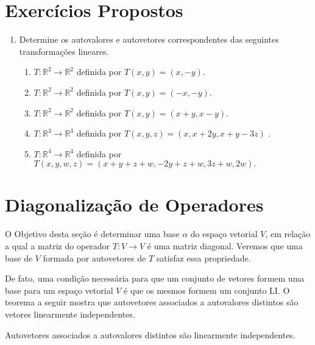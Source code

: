 \section{Exercícios Propostos}
\begin{enumerate}
\item  Determine os autovalores e autovetores correspondentes das seguintes transformações lineares.
\begin{enumerate}[label=(\alph*)]
\item $T: \mathbb{R}^2 \rightarrow \mathbb{R}^2$  definida por $T(x,y)=(x,-y)$.
\item  $T: \mathbb{R}^2 \rightarrow \mathbb{R}^2$  definida por $T(x,y)=(-x,-y)$.
\item  $T: \mathbb{R}^2 \rightarrow \mathbb{R}^2$  definida por $T(x,y)=(x+y,x-y)$.
\item  $T: \mathbb{R}^3 \rightarrow \mathbb{R}^3$  definida por $T(x,y,z)=(x,x+2y, x+y-3z)$ .
\item  $T: \mathbb{R}^4 \rightarrow \mathbb{R}^4$  definida por $T(x,y,w,z)=(x+y+z+w, -2y+z+w, 3z+w, 2w).$
\end{enumerate}

\end{enumerate}

\section{Diagonalização de Operadores}

O Objetivo desta seção é determinar uma base $\alpha$ do espaço vetorial $V$, em relação a qual a matriz do operador $T : V \rightarrow V$ é uma matriz diagonal. Veremos  que  uma base de $V$  formada por autovetores de $T$  satisfaz essa propriedade.

De  fato,  uma condição necessária para que um conjunto de vetores formem uma base para um espaço vetorial $V$ é que os mesmos formem um conjunto LI. O teorema a seguir mostra que autovetores associados a autovalores distintos são vetores linearmente independentes.

\begin{thm} Autovetores associados a autovalores distintos são linearmente independentes.\label{teo1}
\end{thm}

